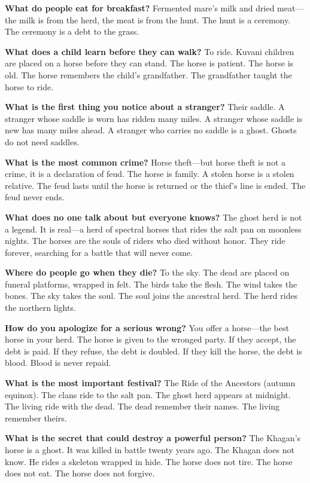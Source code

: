 \vspace{1em}

\begin{almanac}
\textbf{What do people eat for breakfast?} Fermented mare's milk and dried meat---the milk is from the herd, the meat is from the hunt. The hunt is a ceremony. The ceremony is a debt to the grass.

\textbf{What does a child learn before they can walk?} To ride. Kuvani children are placed on a horse before they can stand. The horse is patient. The horse is old. The horse remembers the child's grandfather. The grandfather taught the horse to ride.

\textbf{What is the first thing you notice about a stranger?} Their saddle. A stranger whose saddle is worn has ridden many miles. A stranger whose saddle is new has many miles ahead. A stranger who carries no saddle is a ghost. Ghosts do not need saddles.

\textbf{What is the most common crime?} Horse theft---but horse theft is not a crime, it is a declaration of feud. The horse is family. A stolen horse is a stolen relative. The feud lasts until the horse is returned or the thief's line is ended. The feud never ends.

\textbf{What does no one talk about but everyone knows?} The ghost herd is not a legend. It is real---a herd of spectral horses that rides the salt pan on moonless nights. The horses are the souls of riders who died without honor. They ride forever, searching for a battle that will never come.

\textbf{Where do people go when they die?} To the sky. The dead are placed on funeral platforms, wrapped in felt. The birds take the flesh. The wind takes the bones. The sky takes the soul. The soul joins the ancestral herd. The herd rides the northern lights.

\textbf{How do you apologize for a serious wrong?} You offer a horse---the best horse in your herd. The horse is given to the wronged party. If they accept, the debt is paid. If they refuse, the debt is doubled. If they kill the horse, the debt is blood. Blood is never repaid.

\textbf{What is the most important festival?} The Ride of the Ancestors (autumn equinox). The clans ride to the salt pan. The ghost herd appears at midnight. The living ride with the dead. The dead remember their names. The living remember theirs.

\textbf{What is the secret that could destroy a powerful person?} The Khagan's horse is a ghost. It was killed in battle twenty years ago. The Khagan does not know. He rides a skeleton wrapped in hide. The horse does not tire. The horse does not eat. The horse does not forgive.
\end{almanac}

